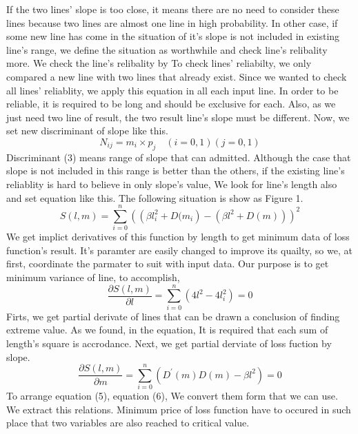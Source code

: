 {\newline If the two lines’ slope is too close, it means there are no need to consider these lines because two lines are almost one line in high probability. In other case, if some new line has come in the situation of it's slope is not included in existing line's range, we define the situation as worthwhile and check line's relibality more. We check the line's relibality by To check lines’ reliabilty, we only compared a new line with two lines that already exist. Since we wanted to check all lines’ reliablity, we apply this equation in all each input line. \newline
In order to be reliable, it is required to be long and should be exclusive for each. Also, as we just need two line of result, the two result line's slope must be different. Now, we set new discriminant of slope like this. 
\begin{equation}
{N}_{ij} = {m}_{i} \times {p}_{j} \quad (i=0,1)(j=0,1)
\end{equation}
Discriminant (3) means range of slope that can admitted. Although the case that slope is not included in this range is better than the others, if the existing line's reliablity is hard to believe in only slope's value, We look for line's length also and set equation like this. The following situation is show as Figure 1. 
\begin{equation}
\mathit{S\left(l,m\right) = \sum_{i=0}^{n}{(\left(\beta{l}_{i}^{2} + D({m}_{i}\right) - (\beta{l}^{2} + D\left(m \right)))}^{2}}
\end{equation}
We get implict derivatives of this function by length to get minimum data of loss function's result. It's paramter are easily changed to improve its quailty, so we, at first, coordinate the parmater to suit with input data. Our purpose is to get minimum variance of line, to accomplish,  
\begin{equation}
\mathit{\frac{\partial S\left(l,m\right)}{\partial l} = \sum_{i=0}^{n}{\left(4{l}^{2}-4{{l}_{i}^{2}}\right)} = 0} 
\end{equation}
Firts, we get partial derivate of lines that can be drawn a conclusion of finding extreme value. As we found, in the equation, It is required that each sum of length's square is accrodance. Next, we get partial derviate of loss fuction by slope.
\begin{equation}
\mathit{\frac{\partial S\left(l,m\right)}{\partial m} = \sum_{i=0}^{n}{({D}^{\prime}(m)D(m) - \beta{l}^{2})} = 0}
\end{equation}
To arrange equation (5), equation (6), We convert them form that we can use. We extract this relations. Minimum price of loss function have to occured in such place that two variables are also reached to critical value.
}
